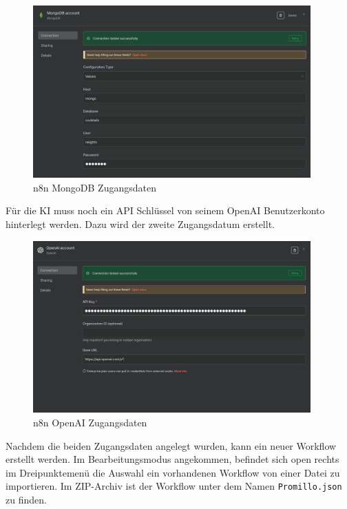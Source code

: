 \begin{figure}
    \begin{center}
        \includegraphics[width=0.95\textwidth]{images/n8n_mongo_creds.png}
    \end{center}
    \caption{n8n MongoDB Zugangsdaten}\label{fig:n8n_mongo_creds}
\end{figure}

Für die KI muss noch ein API Schlüssel von seinem OpenAI Benutzerkonto hinterlegt werden. Dazu wird
der zweite Zugangsdatum erstellt.

\begin{figure}
    \begin{center}
        \includegraphics[width=0.95\textwidth]{images/n8n_openai_creds.png}
    \end{center}
    \caption{n8n OpenAI Zugangsdaten}\label{fig:n8n_openai_creds}
\end{figure}

Nachdem die beiden Zugangsdaten angelegt wurden, kann ein neuer Workflow erstellt werden. Im
Bearbeitungsmodus angekommen, befindet sich open rechts im Dreipunktemenü die Auswahl ein
vorhandenen Workflow von einer Datei zu importieren. Im ZIP-Archiv ist der Workflow unter dem Namen
\verb|Promillo.json| zu finden.

